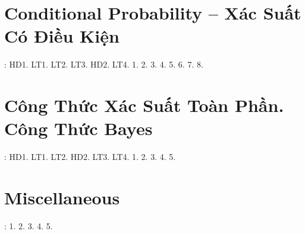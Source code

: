 \documentclass{article}
\begin{document}

\section{Conditional Probability -- Xác Suất Có Điều Kiện}
\cite[Chap. VI, \S1, pp. 90--96]{SGK_Toan_12_Canh_Dieu_tap_2}: HD1. LT1. LT2. LT3. HD2. LT4. 1. 2. 3. 4. 5. 6. 7. 8.


\section{Công Thức Xác Suất Toàn Phần. Công Thức Bayes}
\cite[Chap. VI, \S2, pp. 97--102]{SGK_Toan_12_Canh_Dieu_tap_2}: HD1. LT1. LT2. HD2. LT3. LT4. 1. 2. 3. 4. 5.


\section{Miscellaneous}
\cite[BTCCVI, p. 103]{SGK_Toan_12_Canh_Dieu_tap_2}: 1. 2. 3. 4. 5.


\printbibliography[heading=bibintoc]
	
\end{document}
